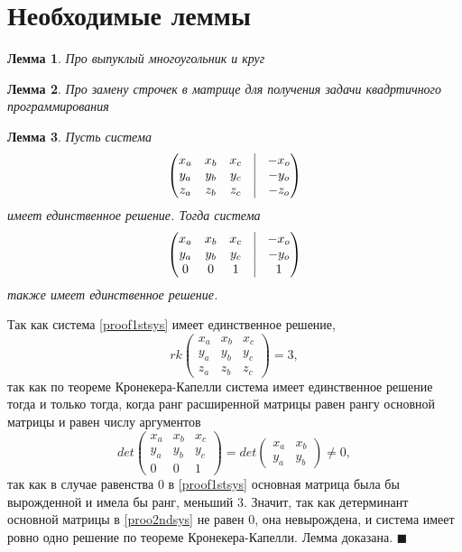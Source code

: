\documentclass[pdftex,ptm,12pt,a4paper]{report}
\newenvironment{Proof} %
  {\par\noindent{\bf Доказательство.}} %
  {\hfill$\scriptstyle\blacksquare$}
\begin{document}
\section{Необходимые леммы}
\newtheorem{Lem}{Лемма}
\begin{Lem}\label{conv}
  Про выпуклый многоугольник и круг
\end{Lem}
\begin{Lem}\label{chstr4edge}
  Про замену строчек в матрице для получения задачи квадртичного программирования
\end{Lem}
\begin{Lem}\label{chstr4check}
  Пусть система
  \begin{equation}\label{proof1stsys}
    \begin{pmatrix}
     x_a & x_b & x_c & \vrule & -x_o\\
     y_a & y_b & y_c & \vrule & -y_o \\
     z_a & z_b & z_c & \vrule & -z_o
     \end{pmatrix}
  \end{equation}
  имеет единственное решение. Тогда система
  \begin{equation}\label{proo2ndsys}
    \begin{pmatrix}
     x_a & x_b & x_c & \vrule & -x_o\\
     y_a & y_b & y_c & \vrule & -y_o \\
     0   & 0   & 1   & \vrule & 1
     \end{pmatrix}
  \end{equation}
  также имеет единственное решение.
\end{Lem}
\begin{Proof}
  Так как система \ref{proof1stsys} имеет единственное решение,
  \[
  rk \begin{pmatrix}
   x_a & x_b & x_c \\
   y_a & y_b & y_c \\
   z_a & z_b & z_c
   \end{pmatrix} = 3,
  \]
  так как по теореме Кронекера-Капелли система имеет единственное решение тогда и только тогда, когда ранг расширенной матрицы равен рангу основной
  матрицы и равен числу аргументов
  \[
    det \begin{pmatrix}
        x_a & x_b & x_c \\
        y_a & y_b & y_c \\
        0   & 0   & 1
        \end{pmatrix} = det
            \begin{pmatrix}
              x_a & x_b \\
              y_a & y_b
            \end{pmatrix} \neq 0,
  \] так как в случае равенства $0$ в \ref{proof1stsys} основная матрица была бы вырожденной и имела бы ранг, меньший $3$.
  Значит, так как детерминант основной матрицы в \ref{proo2ndsys} не равен 0, она невырождена, и система имеет ровно одно решение по теореме Кронекера-Капелли.
  Лемма доказана.
\end{Proof}
\end{document}
